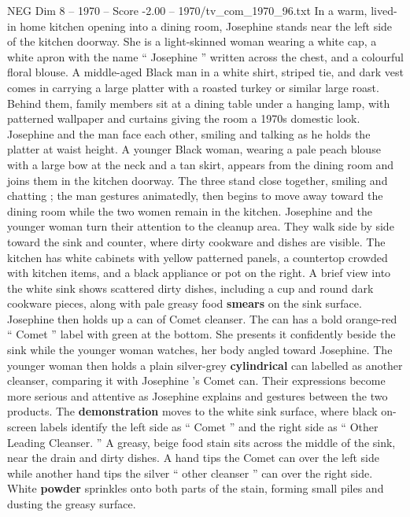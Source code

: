 \begin{textsample}{NEG Dim 8 – 1970 – Score -2.00 – 1970/tv\_com\_1970\_96.txt}  \label{ex:f8_neg_068}
In a warm, lived-in home kitchen opening into a dining room, Josephine stands near the left side of the kitchen doorway.
She is a light-skinned woman wearing a white cap, a white apron with the name “ Josephine ” written across the chest, and a colourful floral blouse.
A middle-aged Black man in a white shirt, striped tie, and dark vest comes in carrying a large platter with a roasted turkey or similar large roast.
Behind them, family members sit at a dining table under a hanging lamp, with patterned wallpaper and curtains giving the room a 1970s domestic look.
Josephine and the man face each other, smiling and talking as he holds the platter at waist height.
A younger Black woman, wearing a pale peach blouse with a large bow at the neck and a tan skirt, appears from the dining room and joins them in the kitchen doorway.
The three stand close together, smiling and chatting ; the man gestures animatedly, then begins to move away toward the dining room while the two women remain in the kitchen.
Josephine and the younger woman turn their attention to the cleanup area.
They walk side by side toward the sink and counter, where dirty cookware and dishes are visible.
The kitchen has white cabinets with yellow patterned panels, a countertop crowded with kitchen items, and a black appliance or pot on the right.
A brief view into the white sink shows scattered dirty dishes, including a cup and round dark cookware pieces, along with pale greasy food \textbf{smears} on the sink surface.
Josephine then holds up a can of Comet cleanser.
The can has a bold orange-red “ Comet ” label with green at the bottom.
She presents it confidently beside the sink while the younger woman watches, her body angled toward Josephine.
The younger woman then holds a plain silver-grey \textbf{cylindrical} can labelled as another cleanser, comparing it with Josephine ’s Comet can.
Their expressions become more serious and attentive as Josephine explains and gestures between the two products.
The \textbf{demonstration} moves to the white sink surface, where black on-screen labels identify the left side as “ Comet ” and the right side as “ Other Leading Cleanser. ” A greasy, beige food stain sits across the middle of the sink, near the drain and dirty dishes.
A hand tips the Comet can over the left side while another hand tips the silver “ other cleanser ” can over the right side.
White \textbf{powder} sprinkles onto both parts of the stain, forming small piles and dusting the greasy surface.

\end{textsample}
